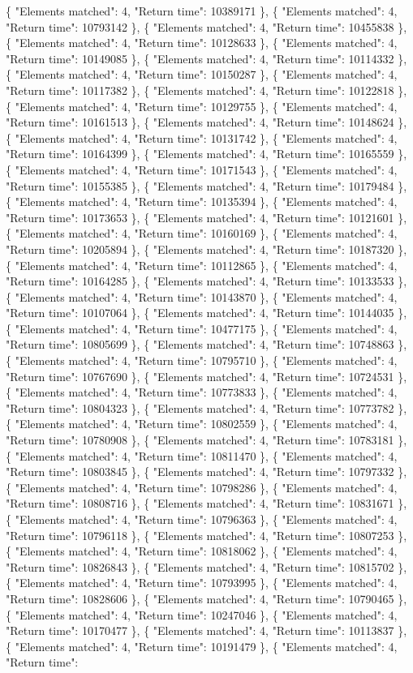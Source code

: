  \{ "Elements matched": 4, "Return time": 10389171 \}, \{ "Elements matched": 4, "Return time": 10793142 \}, \{ "Elements matched": 4, "Return time": 10455838 \}, \{ "Elements matched": 4, "Return time": 10128633 \}, \{ "Elements matched": 4, "Return time": 10149085 \}, \{ "Elements matched": 4, "Return time": 10114332 \}, \{ "Elements matched": 4, "Return time": 10150287 \}, \{ "Elements matched": 4, "Return time": 10117382 \}, \{ "Elements matched": 4, "Return time": 10122818 \}, \{ "Elements matched": 4, "Return time": 10129755 \}, \{ "Elements matched": 4, "Return time": 10161513 \}, \{ "Elements matched": 4, "Return time": 10148624 \}, \{ "Elements matched": 4, "Return time": 10131742 \}, \{ "Elements matched": 4, "Return time": 10164399 \}, \{ "Elements matched": 4, "Return time": 10165559 \}, \{ "Elements matched": 4, "Return time": 10171543 \}, \{ "Elements matched": 4, "Return time": 10155385 \}, \{ "Elements matched": 4, "Return time": 10179484 \}, \{ "Elements matched": 4, "Return time": 10135394 \}, \{ "Elements matched": 4, "Return time": 10173653 \}, \{ "Elements matched": 4, "Return time": 10121601 \}, \{ "Elements matched": 4, "Return time": 10160169 \}, \{ "Elements matched": 4, "Return time": 10205894 \}, \{ "Elements matched": 4, "Return time": 10187320 \}, \{ "Elements matched": 4, "Return time": 10112865 \}, \{ "Elements matched": 4, "Return time": 10164285 \}, \{ "Elements matched": 4, "Return time": 10133533 \}, \{ "Elements matched": 4, "Return time": 10143870 \}, \{ "Elements matched": 4, "Return time": 10107064 \}, \{ "Elements matched": 4, "Return time": 10144035 \}, \{ "Elements matched": 4, "Return time": 10477175 \}, \{ "Elements matched": 4, "Return time": 10805699 \}, \{ "Elements matched": 4, "Return time": 10748863 \}, \{ "Elements matched": 4, "Return time": 10795710 \}, \{ "Elements matched": 4, "Return time": 10767690 \}, \{ "Elements matched": 4, "Return time": 10724531 \}, \{ "Elements matched": 4, "Return time": 10773833 \}, \{ "Elements matched": 4, "Return time": 10804323 \}, \{ "Elements matched": 4, "Return time": 10773782 \}, \{ "Elements matched": 4, "Return time": 10802559 \}, \{ "Elements matched": 4, "Return time": 10780908 \}, \{ "Elements matched": 4, "Return time": 10783181 \}, \{ "Elements matched": 4, "Return time": 10811470 \}, \{ "Elements matched": 4, "Return time": 10803845 \}, \{ "Elements matched": 4, "Return time": 10797332 \}, \{ "Elements matched": 4, "Return time": 10798286 \}, \{ "Elements matched": 4, "Return time": 10808716 \}, \{ "Elements matched": 4, "Return time": 10831671 \}, \{ "Elements matched": 4, "Return time": 10796363 \}, \{ "Elements matched": 4, "Return time": 10796118 \}, \{ "Elements matched": 4, "Return time": 10807253 \}, \{ "Elements matched": 4, "Return time": 10818062 \}, \{ "Elements matched": 4, "Return time": 10826843 \}, \{ "Elements matched": 4, "Return time": 10815702 \}, \{ "Elements matched": 4, "Return time": 10793995 \}, \{ "Elements matched": 4, "Return time": 10828606 \}, \{ "Elements matched": 4, "Return time": 10790465 \}, \{ "Elements matched": 4, "Return time": 10247046 \}, \{ "Elements matched": 4, "Return time": 10170477 \}, \{ "Elements matched": 4, "Return time": 10113837 \}, \{ "Elements matched": 4, "Return time": 10191479 \}, \{ "Elements matched": 4, "Return time": 